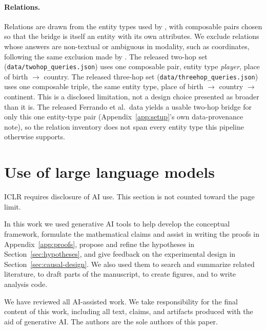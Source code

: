 \documentclass{article}
\begin{document}
\paragraph{Relations.} Relations are drawn from the entity types used by \citet{ferrando2025entity},
with composable pairs chosen so that the bridge is itself an entity with its own attributes. We
exclude relations whose answers are non-textual or ambiguous in modality, such as coordinates,
following the same exclusion made by \citet{tamoyan2025factual}. The released two-hop set
(\texttt{data/twohop\_queries.json}) uses one composable pair, entity type \emph{player}, place of
birth $\to$ country. The released three-hop set (\texttt{data/threehop\_queries.json}) uses one
composable triple, the same entity type, place of birth $\to$ country $\to$ continent. This is a
disclosed limitation, not a design choice presented as broader than it is. The released Ferrando et
al.\ data yields a usable two-hop bridge for only this one entity-type pair (Appendix~\ref{app:setup}'s
own data-provenance note), so the relation inventory does not span every entity type this pipeline
otherwise supports.

\section{Use of large language models}
\label{app:ai}

ICLR requires disclosure of AI use. This section is not counted toward the page limit.

In this work we used generative AI tools to help develop the conceptual framework, formulate the
mathematical claims and assist in writing the proofs in Appendix~\ref{app:proofs}, propose and refine
the hypotheses in Section~\ref{sec:hypotheses}, and give feedback on the experimental design in
Section~\ref{sec:causal-design}. We also used them to search and summarize related literature, to
draft parts of the manuscript, to create figures, and to write analysis code.

We have reviewed all AI-assisted work. We take responsibility for
the final content of this work, including all text, claims, and artifacts produced with the aid of
generative AI. The authors are the sole authors of this paper.
\end{document}
